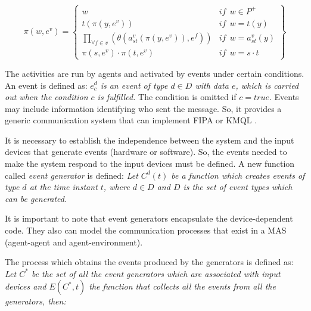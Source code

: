 \documentclass[a4paper,twoside]{article}
\begin{document}
\begin{small}
\begin{equation}
    \pi (w, e^v) = \left\{
    \begin{array}{ll}
        w   & \mathit{if}  \ \ w \in P^+  \\

        t(\pi (y, e^v))     & \mathit{if}  \ \  w = t(y)  \\

        \underset{\forall f \in v}{ \prod }(\theta (a_{st}^v (\pi
            (y, e^v)), e^f))    & \mathit{if}  \ \ w = a_{st}^v(y) \\

        \pi (s, e^v) \cdot \pi (t, e^v)    & \mathit{if}  \
            \  w = s \cdot t
    \end{array}\right\}
\end{equation}
\end{small}

The activities are run by agents and activated by events under certain conditions. An event is
defined as: {\itshape $e_c^d$ is an event of type $d \in D$ with data $e$, which is carried out
when the condition $c$ is fulfilled.} The condition is omitted if $c = true$. Events may include
information identifying who sent the message. So, it provides a generic communication system that
can implement FIPA or KMQL \cite{Genesereth1995}.

It is necessary to establish the independence between the system and the input devices that
generate events (hardware or software). So, the events needed to make the system respond to the
input devices must be defined. A new function called \textit{event generator} is defined: {\itshape
Let $C^d(t)$ be a function which creates events of type $d$ at the time instant $t$, where $d \in
D$ and $D$ is the set of event types which can be generated. }

It is important to note that event generators encapsulate the device-dependent code.
They also can model the communication processes that exist in a MAS (agent-agent and
agent-environment).

The process which obtains the events produced by the generators is defined as: {\itshape Let $C^*$
be the set of all the event generators which are associated with input devices and $E(C^*, t)$ the
function that collects all the events from all the generators, then:}
\end{document}
